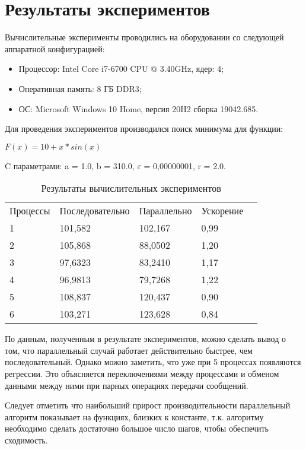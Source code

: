 \documentclass{report}
\begin{document}
\section*{Результаты экспериментов}
Вычислительные эксперименты проводились на оборудовании со следующей аппаратной конфигурацией:

\begin{itemize}
\item Процессор: Intel Core i7-6700 CPU @ 3.40GHz, ядер: 4;
\item Оперативная память: 8 ГБ DDR3;
\item ОС: Microsoft Windows 10 Home, версия 20H2 сборка 19042.685.
\end{itemize}

\par Для проведения экспериментов производился поиск минимума для функции:
\\
\begin{center}
$F(x) = 10 + x * sin(x)$
\end{center}
\begin{center}
C параметрами: a = 1.0, b = 310.0, $\varepsilon$ = 0,00000001, r = 2.0.
\end{center}

\begin{table}[!h]
\begin{center}
\begin{tabular}{lllll}
Процессы & Последовательно & Параллельно & Ускорение  \\
1        & 101,582         & 102,167     & 0,99       \\
2        & 105,868         & 88,0502     & 1,20       \\
3        & 97,6323         & 83,2410     & 1,17       \\
4        & 96,9813         & 79,7268     & 1,22       \\
5        & 108,837         & 120,437     & 0,90       \\
6        & 103,271         & 123,628     & 0,84       
\end{tabular}
\end{center}
\caption{Результаты вычислительных экспериментов}
\centering
\end{table}

\par По данным, полученным в результате экспериментов, можно сделать вывод о том, что параллельный случай работает действительно быстрее, чем последовательный. Однако можно заметить, что уже при 5 процессах появляются регрессии. Это объясняется переключениями между процессами и обменом данными между ними при парных операциях передачи сообщений.
\par Следует отметить что наибольший прирост производительности параллельный алгоритм показывает на функциях, близких к константе, т.к. алгоритму необходимо сделать достаточно большое число шагов, чтобы обеспечить сходимость.
\newpage
\end{document}
